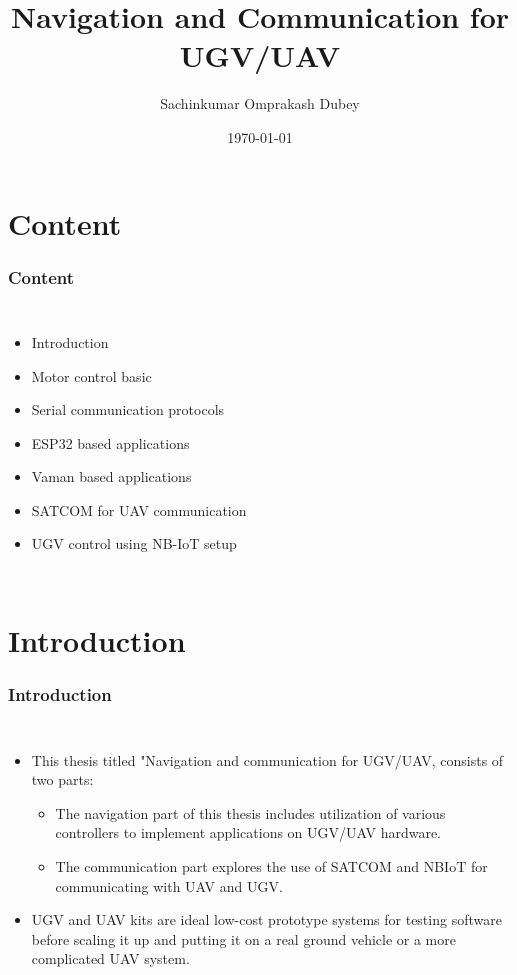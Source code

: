 \documentclass[xcolor=table]{beamer}
\title{Navigation and Communication for UGV/UAV}
\author{Sachinkumar Omprakash Dubey}
\institute{Indian Institute of Technology, Hyderabad.}
\date{\today}
\begin{document}
\begin{frame}
\titlepage
\end{frame}
\section{Content}
\begin{frame}
\frametitle{Content}
\begin{columns}
  \begin{itemize}
  \item Introduction
  \item Motor control basic
  \item Serial communication protocols
  \item ESP32 based applications
  \item Vaman based applications
  \item SATCOM for UAV communication
  \item UGV control using NB-IoT setup
  \end{itemize}
\end{columns}

\end{frame}


\section{Introduction}
\begin{frame}
\frametitle{Introduction}
\begin{columns}
  \begin{itemize}
  \item This thesis titled "Navigation and communication for UGV/UAV, consists of two parts:
   \begin{itemize}
  \item The navigation part of this thesis includes utilization of various controllers to implement applications on UGV/UAV hardware.
  \item The communication part explores the use of SATCOM and NBIoT for communicating with UAV and UGV.
  \end{itemize}
  \item UGV and UAV kits are ideal low-cost prototype systems for testing software before scaling it up and putting it on a real ground vehicle or a more complicated UAV system. 
  \end{itemize}
\end{columns}
\end{frame}
\end{document}
